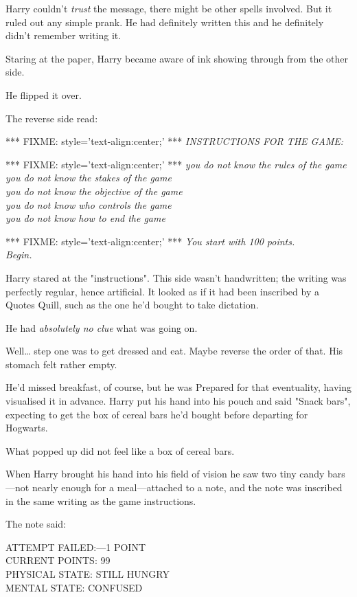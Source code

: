 Harry couldn't \emph{trust} the message, there might be other spells involved. 
But it ruled out any simple prank. He had definitely written this and he 
definitely didn't remember writing it.

Staring at the paper, Harry became aware of ink showing through from the other 
side.

He flipped it over.

The reverse side read:

*** FIXME: style='text-align:center;' ***
\emph{INSTRUCTIONS FOR THE GAME:}

*** FIXME: style='text-align:center;' ***
\emph{you do not know the rules of the game\\
you do not know the stakes of the game\\
you do not know the objective of the game\\
you do not know who controls the game\\
you do not know how to end the game}

*** FIXME: style='text-align:center;' ***
\emph{You start with 100 points.\\
Begin.}

Harry stared at the "instructions". This side wasn't handwritten; the writing 
was perfectly regular, hence artificial. It looked as if it had been inscribed 
by a Quotes Quill, such as the one he'd bought to take dictation.

He had \emph{absolutely no clue} what was going on.

Well{\ldots} step one was to get dressed and eat. Maybe reverse the order of 
that. His stomach felt rather empty.

He'd missed breakfast, of course, but he was Prepared for that eventuality, 
having visualised it in advance. Harry put his hand into his pouch and said 
"Snack bars", expecting to get the box of cereal bars he'd bought before 
departing for Hogwarts.

What popped up did not feel like a box of cereal bars.

When Harry brought his hand into his field of vision he saw two tiny candy 
bars---not nearly enough for a meal---attached to a note, and the note was 
inscribed in the same writing as the game instructions.

The note said:

ATTEMPT FAILED:---1 POINT\\
CURRENT POINTS: 99\\
PHYSICAL STATE: STILL HUNGRY\\
MENTAL STATE: CONFUSED

